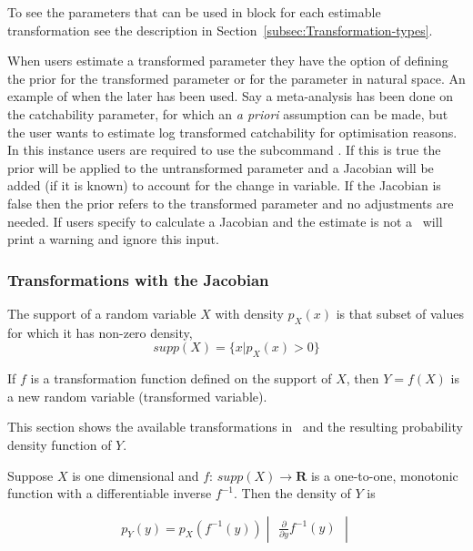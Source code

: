 To see the parameters that can be used in  block for each estimable transformation see the  description in Section~\ref{subsec:Transformation-types}.

When users estimate a transformed parameter they have the option of defining the prior for the transformed parameter or for the parameter in natural space. An example of when the later has been used. Say a meta-analysis has been done on the catchability parameter, for which an \textit{a priori} assumption can be made, but the user wants to estimate log transformed catchability for optimisation reasons. In this instance users are required to use the subcommand . If this is true the prior will be applied to the untransformed parameter and a Jacobian will be added (if it is known) to account for the change in variable. If the Jacobian is false then the prior refers to the transformed parameter and no adjustments are needed. If users specify to calculate a Jacobian and the estimate is not a  \CNAME\ will print a warning and ignore this input.

\subsubsection{Transformations with the Jacobian}
The support of a random variable $X$ with density $p_X(x)$ is that subset of values for which it has non-zero density,
\begin{equation}
  supp(X) = \{x|p_X(x) > 0\}
\end{equation}

If $f$ is a transformation function defined on the support of $X$, then $Y = f(X)$ is a new random variable (transformed variable).

This section shows the available transformations in \CNAME\ and the resulting probability density function of $Y$. %

Suppose $X$ is one dimensional and $f$: $supp(X) \to \mathbf{R}$ is a one-to-one, monotonic function with a differentiable inverse $f^{-1}$. Then the density of $Y$ is

\begin{equation}\label{eq:jacobian}
	p_Y(y) = p_X(f^{-1}(y)) \begin{vmatrix} \frac{\partial}{\partial y} f^{-1}(y) \end{vmatrix}
\end{equation}

